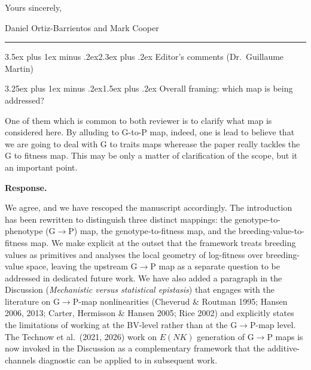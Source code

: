 \documentclass[11pt,a4paper]{article}
\makeatletter
\newcommand{\response}{%
  \par\medskip\noindent\textbf{\color{ResponseColor}Response.}\quad\ignorespaces
}
\renewcommand{\section}{\@startsection{section}{1}{0pt}%
  {3.5ex plus 1ex minus .2ex}{2.3ex plus .2ex}%
  {\Large\bfseries\color{ReviewerColor}}}
\renewcommand{\subsection}{\@startsection{subsection}{2}{0pt}%
  {3.25ex plus 1ex minus .2ex}{1.5ex plus .2ex}%
  {\large\bfseries}}
\makeatother
\begin{document}
\medskip

\noindent Yours sincerely,

\medskip

\noindent Daniel Ortiz-Barrientos and Mark Cooper

\vfill

\noindent\rule{\textwidth}{0.4pt}

\tableofcontents

\newpage



\section{Editor's comments (Dr.~Guillaume Martin)}

\subsection{Overall framing: which map is being addressed?}

\begin{edquote}
One of them which is common to both reviewer is to clarify what map is considered here. By alluding to G-to-P map, indeed, one is lead to believe that we are going to deal with G to traits maps wherease the paper really tackles the G to fitness map. This may be only a matter of clarification of the scope, but it an important point.
\end{edquote}

\response
We agree, and we have rescoped the manuscript accordingly. The introduction has been rewritten to distinguish three distinct mappings: the genotype-to-phenotype (G$\to$P) map, the genotype-to-fitness map, and the breeding-value-to-fitness map. We make explicit at the outset that the framework treats breeding values as primitives and analyses the local geometry of log-fitness over breeding-value space, leaving the upstream G$\to$P map as a separate question to be addressed in dedicated future work. We have also added a paragraph in the Discussion (\textit{Mechanistic versus statistical epistasis}) that engages with the literature on G$\to$P-map nonlinearities (Cheverud \& Routman 1995; Hansen 2006, 2013; Carter, Hermisson \& Hansen 2005; Rice 2002) and explicitly states the limitations of working at the BV-level rather than at the G$\to$P-map level. The Technow et al.\ (2021, 2026) work on $E(NK)$ generation of G$\to$P maps is now invoked in the Discussion as a complementary framework that the additive-channels diagnostic can be applied to in subsequent work.
\end{document}
